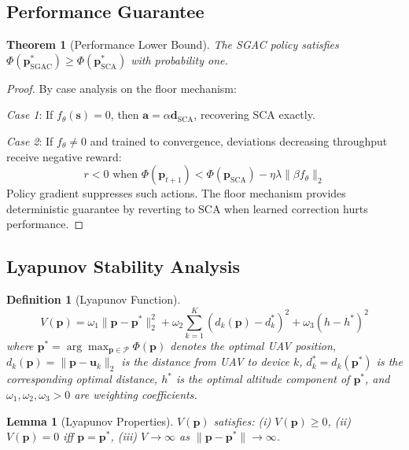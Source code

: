 \documentclass[journal]{IEEEtran}
\newtheorem{theorem}{Theorem}
\newtheorem{lemma}{Lemma}
\newtheorem{definition}{Definition}
\begin{document}
\subsection{Performance Guarantee}

\begin{theorem}[Performance Lower Bound]
\label{thm:floor}
The SGAC policy satisfies $\Phi(\mathbf{p}^*_{\text{SGAC}}) \geq \Phi(\mathbf{p}^*_{\text{SCA}})$ with probability one.
\end{theorem}

\begin{proof}
By case analysis on the floor mechanism:

\textit{Case 1}: If $f_\theta(\mathbf{s}) = 0$, then $\mathbf{a} = \alpha\mathbf{d}_{\text{SCA}}$, recovering SCA exactly.

\textit{Case 2}: If $f_\theta \neq 0$ and trained to convergence, deviations decreasing throughput receive negative reward:
\begin{equation}
r < 0 \text{ when } \Phi(\mathbf{p}_{t+1}) < \Phi(\mathbf{p}_{\text{SCA}}) - \eta\lambda\|\beta f_\theta\|_2
\end{equation}
Policy gradient suppresses such actions. The floor mechanism provides deterministic guarantee by reverting to SCA when learned correction hurts performance.
\end{proof}

\subsection{Lyapunov Stability Analysis}

\begin{definition}[Lyapunov Function]
\begin{equation}
V(\mathbf{p}) = \omega_1 \|\mathbf{p} - \mathbf{p}^*\|_2^2 + \omega_2 \sum_{k=1}^K (d_k(\mathbf{p}) - d^*_k)^2 + \omega_3 (h - h^*)^2
\end{equation}
where $\mathbf{p}^* = \arg\max_{\mathbf{p} \in \mathcal{P}} \Phi(\mathbf{p})$ denotes the optimal UAV position, $d_k(\mathbf{p}) = \|\mathbf{p} - \mathbf{u}_k\|_2$ is the distance from UAV to device $k$, $d^*_k = d_k(\mathbf{p}^*)$ is the corresponding optimal distance, $h^*$ is the optimal altitude component of $\mathbf{p}^*$, and $\omega_1, \omega_2, \omega_3 > 0$ are weighting coefficients.
\end{definition}

\begin{lemma}[Lyapunov Properties]
$V(\mathbf{p})$ satisfies: (i) $V(\mathbf{p}) \geq 0$, (ii) $V(\mathbf{p}) = 0$ iff $\mathbf{p} = \mathbf{p}^*$, (iii) $V \to \infty$ as $\|\mathbf{p} - \mathbf{p}^*\| \to \infty$.
\end{lemma}
\end{document}
